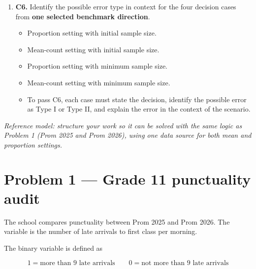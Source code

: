 \documentclass[12pt]{article}
\begin{document}
\begin{enumerate}
	\item \textbf{C6.} Identify the possible error type in context for the four decision cases from \textbf{one selected benchmark direction}.
	\begin{itemize}
		\item Proportion setting with initial sample size.
		\item Mean-count setting with initial sample size.
		\item Proportion setting with minimum sample size.
		\item Mean-count setting with minimum sample size.
		\item To pass C6, each case must state the decision, identify the possible error as Type I or Type II, and explain the error in the context of the scenario.
	\end{itemize}
\end{enumerate}

\textit{Reference model: structure your work so it can be solved with the same logic as Problem 1 (Prom 2025 and Prom 2026), using one data source for both mean and proportion settings.}

	\section*{Problem 1 --- Grade 11 punctuality audit}
	
	The school compares punctuality between Prom 2025 and Prom 2026. The variable is the number of late arrivals to first class per morning.
	
	The binary variable is defined as
	
	\[
	1=\text{more than }9\text{ late arrivals}
	\qquad
	0=\text{not more than }9\text{ late arrivals}
	\]
	
\end{document}
